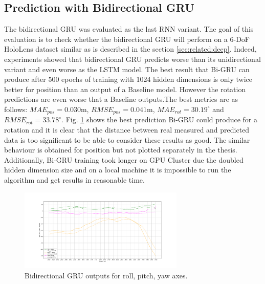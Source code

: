\subsection{Prediction with Bidirectional GRU}
\label{sec:eval:experiments:bi-gru}
The bidirectional GRU was evaluated as the last RNN variant. The goal of this evaluation is to check whether the bidirectional GRU will perform on a 6-DoF HoloLens dataset similar as is described in the section \ref{sec:related:deep}. Indeed, experiments showed that bidirectional GRU predicts worse than its unidirectional variant and even worse as the LSTM model. The best result that Bi-GRU can produce after 500 epochs of training with 1024 hidden dimensions is only twice better for position than an output of a Baseline model. However the rotation predictions are even worse that a Baseline outputs.The best metrics are as follows: $MAE_{pos} = 0.030$m, $RMSE_{pos} = 0.041$m, $MAE_{rot} = 30.19^{\circ}$ and $RMSE_{rot} =33.78^{\circ}$. Fig. \ref{fig:grubi} shows the best prediction Bi-GRU could produce for a rotation and it is clear that the distance between real measured and predicted data is too significant to be able to consider these results as good. The similar behaviour is obtained for position but not plotted separately in the thesis. Additionally, Bi-GRU training took longer on GPU Cluster due the doubled hidden dimension size and on a local machine it is impossible to run the algorithm and get results in reasonable time. 
\begin{figure}[h!]
	\begin{center}
		\includegraphics[width=0.7\textwidth, keepaspectratio]{gfx/gru-bi1-roll_pitch_yaw.pdf}
		\caption{Bidirectional GRU outputs for roll, pitch, yaw axes.}
		\label{fig:grubi}
	\end{center}
\end{figure}